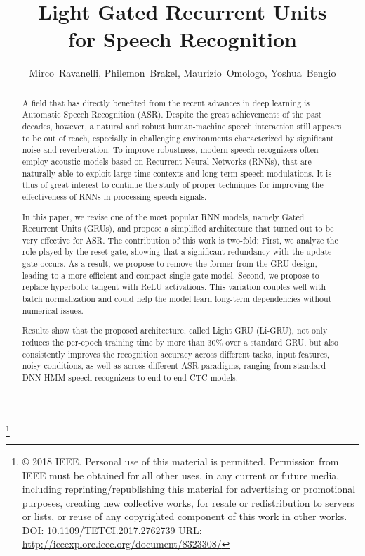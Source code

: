 \documentclass[journal]{IEEEtran}
\begin{document}
\title{Light Gated Recurrent Units  \\ for Speech Recognition}




\author{Mirco~Ravanelli,
        Philemon~Brakel,
        Maurizio~Omologo,
        Yoshua~Bengio
        }        
        

\maketitle
\footnote{© 2018 IEEE. Personal use of this material is permitted. Permission from IEEE must be obtained for all other uses, in any current or future media, including reprinting/republishing this material for advertising or promotional purposes, creating new collective works, for resale or redistribution to servers or lists, or reuse of any copyrighted component of this work in other works.  DOI: 10.1109/TETCI.2017.2762739 URL: \url{http://ieeexplore.ieee.org/document/8323308/}}
\begin{abstract}
A field that has directly benefited from the recent advances in deep learning is Automatic Speech Recognition (ASR). 
Despite the great achievements of the past decades, however, a natural and robust human-machine speech interaction still appears to be out of reach, especially in challenging environments characterized by significant noise and reverberation.
To improve robustness, modern speech recognizers often employ acoustic models based on Recurrent Neural Networks (RNNs), that are naturally able to exploit large time contexts and long-term speech modulations. It is thus of great interest to continue the study of proper techniques for improving the effectiveness of RNNs in processing speech signals.

In this paper,  we revise one of the most popular RNN models, namely Gated Recurrent Units (GRUs), and propose a simplified architecture that turned out to be very effective for ASR. The contribution of this work is two-fold: First, we analyze the role played by the reset gate, showing that a significant redundancy with the update gate occurs. As a result, we propose to remove the former from  the GRU design, leading to a more efficient and compact single-gate model. Second, we propose to replace hyperbolic tangent with ReLU activations. This variation couples well with batch normalization and could help the model learn long-term dependencies without numerical issues.

Results show that the proposed architecture, called Light GRU (Li-GRU), not only reduces the per-epoch training time by more than 30\% over a standard GRU, but also  consistently improves the recognition accuracy across different tasks, input features, noisy conditions, as well as across different ASR paradigms, ranging from standard DNN-HMM speech recognizers to end-to-end CTC models.
\end{abstract}
\end{document}
